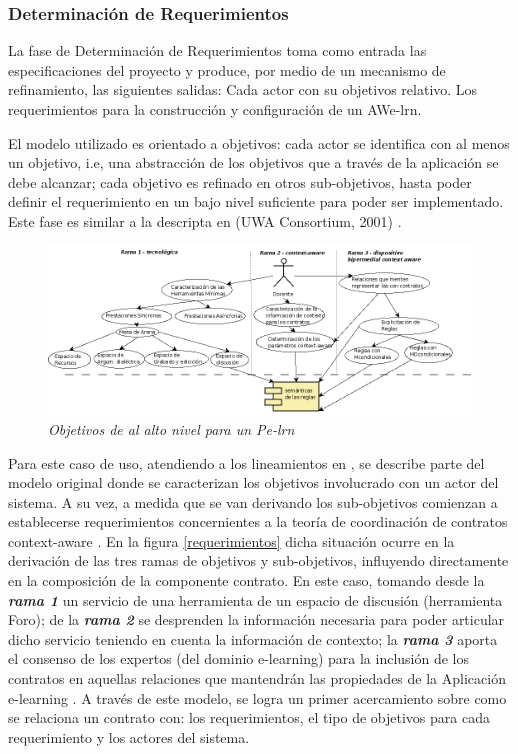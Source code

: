 \subsubsection{Determinación de Requerimientos} \label{sdr7}

La fase de Determinación de Requerimientos toma como entrada las
especificaciones del proyecto y produce, por medio de un mecanismo de
refinamiento, las siguientes salidas: Cada actor con su objetivos relativo. Los
requerimientos para la construcción y configuración de un AWe-lrn.
 
El modelo utilizado es orientado a objetivos: cada actor se identifica con al
menos un objetivo, i.e, una abstracción de los objetivos que a través de la
aplicación se debe alcanzar; cada objetivo es refinado en otros sub-objetivos,
hasta poder definir el requerimiento en un bajo nivel suficiente para poder ser
implementado. Este fase es similar a la descripta en (UWA Consortium, 2001)
\cite{UWA}. 

	\begin{figure}[!h]
        	\begin{center}
		 \includegraphics[width= 5 in,totalheight=3.8 in]{Ch7/Requerimientos}
                \caption{\small \sl Objetivos de al alto nivel para un Pe-lrn}
\label{requerimientos7}
         	\end{center}
         \end{figure}

Para este caso de uso, atendiendo a los lineamientos en \cite{libro}, se
describe parte del modelo original donde se caracterizan los objetivos
involucrado con un actor del sistema. A su vez, a medida que se van derivando
los sub-objetivos comienzan a establecerse requerimientos concernientes a la
teoría de coordinación de contratos context-aware \cite{libro5,fiadeiro}. En la
figura \ref{requerimientos} dicha situación ocurre en la derivación de las tres
ramas de objetivos y sub-objetivos, influyendo directamente en la composición de
la componente contrato. En este caso, tomando desde la \textit{\textbf{rama 1}}
un servicio de una herramienta de un espacio de discusión (herramienta Foro); de
la \textit{\textbf{rama 2}} se desprenden la información necesaria para poder
articular dicho servicio teniendo en cuenta la información de contexto;  la
\textit{\textbf{rama 3}} aporta el consenso de los expertos (del dominio
e-learning) para la inclusión de los contratos en aquellas relaciones que
mantendrán las propiedades de la Aplicación e-learning \cite{libro5}. A través
de este modelo, se logra un primer acercamiento sobre como se relaciona un
contrato con: los requerimientos, el tipo de objetivos para cada requerimiento y
los actores del sistema. 

